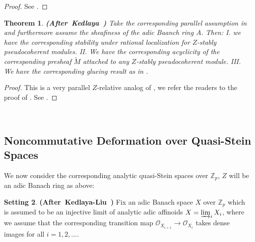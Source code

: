 \documentclass[12pt]{amsart}
\newtheorem{theorem}{Theorem}[section]
\theoremstyle{definition}
\numberwithin{equation}{section}
\newtheorem{setting}[theorem]{Setting}
\begin{document}
\begin{proof}
See \cite[Corollary 1.9.18]{Ked2}.	
\end{proof}




\begin{theorem} \mbox{\bf{(After Kedlaya \cite[Theorem 1.4.14, Theorem 1.4.16, Theorem 1.4.18]{Ked2})}}
Take the corresponding parallel assumption in \cite[1.7.1]{Ked2} and furthermore assume the sheafiness of the adic Baanch ring $A$. Then: I. we have the corresponding stability under rational localization for $Z$-stably pseudocoherent modules. II. We have the corresponding acyclicity of the corresponding presheaf $\widetilde{M}$ attached to any $Z$-stably pseudocoherent module. III. We have the corresponding glueing result as in \cite[Theorem 1.4.18]{Ked2}.
\end{theorem}


\begin{proof}
This is a very parallel $Z$-relative analog of \cite[Theorem 1.4.14, Theorem 1.4.16, Theorem 1.4.18]{Ked2}, we refer the readers to the proof of \cite[Theorem 1.4.14, Theorem 1.4.16, Theorem 1.4.18]{Ked2}. See \cite[After Corollary 1.9.18, the proof of Theorem 1.4.14, the proof of Theorem 1.4.16, the proof of Theorem 1.4.18]{Ked2}.	
\end{proof}


\




\subsection{Noncommutative Deformation over Quasi-Stein Spaces}

\indent We now consider the corresponding analytic quasi-Stein spaces over $\mathbb{Z}_p$, $Z$ will be an adic Banach ring as above:

\begin{setting} \mbox{\bf{(After Kedlaya-Liu \cite[Definition 2.6.2]{KL2})}}
Fix an adic Banach space $X$ over $\mathbb{Z}_p$ which is assumed to be an injective limit of analytic adic affinoids $X=\varinjlim_i X_i$, where we assume that the corresponding transition map $\mathcal{O}_{X_{i+1}}\rightarrow \mathcal{O}_{X_{i}}$ takes dense images for all $i=1,2,...$.	
\end{setting}
\end{document}
